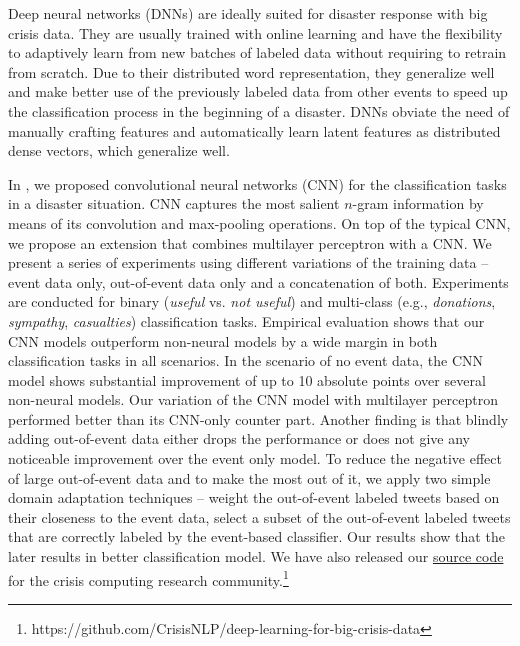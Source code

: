 \documentclass{article} %
\begin{document}
Deep neural networks (DNNs) are ideally suited for disaster response with big crisis data. They are usually trained with online learning and have the flexibility to adaptively learn from new batches of labeled data without requiring to retrain from scratch. Due to their distributed word representation, they generalize well and make better use of the previously labeled data from other events to speed up the classification process in the beginning of a disaster. DNNs
obviate the need of manually crafting features and automatically learn latent features as distributed dense vectors, which generalize well.

In \cite{Dat16_bigData},  we proposed convolutional neural networks (CNN) for the classification tasks in a disaster situation. CNN captures the most salient $n$-gram information by means of its convolution and max-pooling operations. On top of the typical CNN, we propose an extension that combines multilayer perceptron with a CNN. We present a series of experiments using different variations of the training data -- event data only, out-of-event data only and a concatenation of both. Experiments are conducted for binary (\emph{useful} vs. \emph{not useful}) and multi-class (e.g., \emph{donations}, \emph{sympathy}, \emph{casualties}) classification tasks. Empirical evaluation shows that our CNN models outperform non-neural models by a wide margin in both classification tasks in all scenarios. In the scenario of no event data, the CNN model shows substantial improvement of up to 10 absolute points over several non-neural models. Our variation of the CNN model with multilayer perceptron performed better than its CNN-only counter part. Another finding is that blindly adding out-of-event data either drops the performance or does not give any noticeable improvement over the event only model. To reduce the negative effect of large out-of-event data and to make the most out of it, we apply two simple domain adaptation techniques -- \Ni weight the out-of-event labeled tweets based on their closeness to the event data, \Nii select a subset of the out-of-event labeled tweets that are correctly labeled by the event-based classifier. Our results show that the later results in better classification model. We have also released our \href{https://github.com/CrisisNLP/deep-learning-for-big-crisis-data}{source code} for the crisis computing research community.\footnote{https://github.com/CrisisNLP/deep-learning-for-big-crisis-data} 



\end{document}
